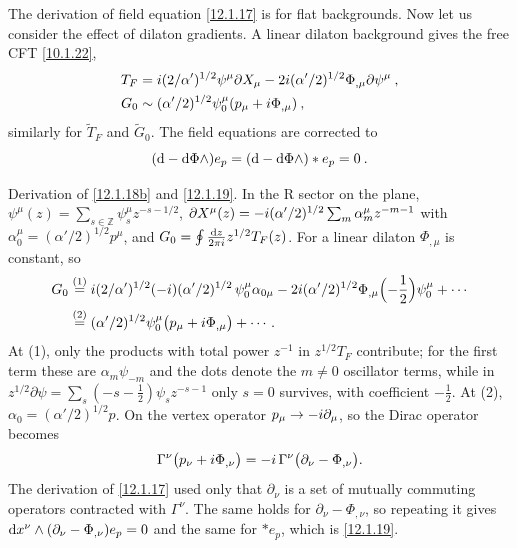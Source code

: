 The derivation of field equation \eqref{12.1.17} is for flat backgrounds. Now let us consider the effect of dilaton gradients. A linear dilaton background gives the free CFT \eqref{10.1.22},
\begin{subequations}
	\begin{align}
		T_{F}&=i(2/\alpha^{\prime})^{1/2}\psi^{\mu}\partial X_{\mu}-2i(\alpha^{\prime}/2)^{1/2}\Phi_{,\mu}\partial\psi^{\mu} \:, \label{12.1.18a} \\
		G_{0}&\sim (\alpha^{\prime}/2)^{1/2}\psi_{0}^{\mu}(p_{\mu}+i\Phi_{,\mu}) \:, \label{12.1.18b}
	\end{align} \label{12.1.18}
\end{subequations}
similarly for $\tilde{T}_{F}$ and $\tilde{G}_{0}$. The field equations are corrected to
\begin{equation}
	(\mathrm{d}-\mathrm{d}\Phi\wedge) e_{p}=(\mathrm{d}-\mathrm{d}\Phi\wedge)\ast e_{p} =0\:. \label{12.1.19}
\end{equation}
\begin{tcolorbox}[breakable]
	\begin{remark}
		Derivation of \eqref{12.1.18b} and \eqref{12.1.19}. In the R sector on the plane, $\psi^{\mu}(z)=\sum_{s\in\mathbb{Z}}\psi^{\mu}_{s}z^{-s-1/2}$, $\partial X^{\mu}(z)=-i(\alpha'/2)^{1/2}\sum_{m}\alpha^{\mu}_{m}z^{-m-1}$ with $\alpha^{\mu}_{0}=(\alpha'/2)^{1/2}p^{\mu}$, and $G_{0}=\oint\frac{\mathrm{d} z}{2\pi i}z^{1/2}T_{F}(z)$. For a linear dilaton $\Phi_{,\mu}$ is constant, so
		\begin{align*}
			G_{0}&\overset{(1)}{=} i(2/\alpha')^{1/2}(-i)(\alpha'/2)^{1/2}\,\psi^{\mu}_{0}\alpha_{0\mu}
			-2i(\alpha'/2)^{1/2}\Phi_{,\mu}\Bigl(-\frac12\Bigr)\psi^{\mu}_{0}+\cdots\\
			&\overset{(2)}{=} (\alpha'/2)^{1/2}\psi^{\mu}_{0}\bigl(p_{\mu}+i\Phi_{,\mu}\bigr)+\cdots .
		\end{align*}
		At (1), only the products with total power $z^{-1}$ in $z^{1/2}T_{F}$ contribute; for the first term these are $\alpha_{m}\psi_{-m}$ and the dots denote the $m\neq0$ oscillator terms, while in $z^{1/2}\partial\psi=\sum_{s}(-s-\frac12)\psi_{s}z^{-s-1}$ only $s=0$ survives, with coefficient $-\frac12$. At (2), $\alpha_{0}=(\alpha'/2)^{1/2}p$. On the vertex operator $p_{\mu}\to-i\partial_{\mu}$, so the Dirac operator becomes
		\[
		\Gamma^{\nu}\bigl(p_{\nu}+i\Phi_{,\nu}\bigr)=-i\,\Gamma^{\nu}\bigl(\partial_{\nu}-\Phi_{,\nu}\bigr) .
		\]
		The derivation of \eqref{12.1.17} used only that $\partial_{\nu}$ is a set of mutually commuting operators contracted with $\Gamma^{\nu}$. The same holds for $\partial_{\nu}-\Phi_{,\nu}$, so repeating it gives $\mathrm{d} x^{\nu}\wedge(\partial_{\nu}-\Phi_{,\nu})e_{p}=0$ and the same for $\ast e_{p}$, which is \eqref{12.1.19}.
	\end{remark}
\end{tcolorbox}
